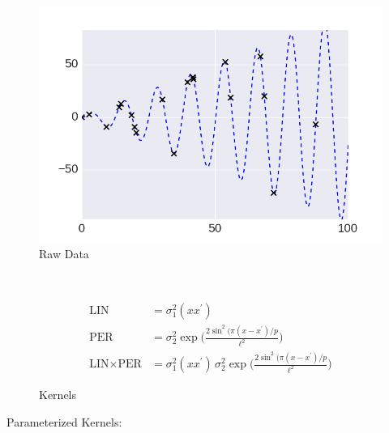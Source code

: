  \centering

     \begin{subfigure}[b]{0.45\textwidth}
        \includegraphics[width=\textwidth]{figs/composition/composition_demo_raw_data.png}
        \caption{Raw Data}
    \end{subfigure}
    ~ %
    \begin{subfigure}[b]{0.45\textwidth}
\small
     \begin{align*}
    \text{LIN} &=   \sigma_1^2(x x^\prime)\\
    \text{PER} &=  \sigma_2^2 \exp \bigg( \frac{2 \sin^2 ( \pi (x - x^\prime)/p}{\ell^2} \bigg)\\ 
    \text{LIN} \times \text{PER} &=  \sigma_1^2(x x^\prime)\, \sigma_2^2 \exp \bigg( \frac{2 \sin^2 ( \pi (x - x^\prime)/p}{\ell^2} \bigg) 
    \end{align*}\vspace{5mm} 
        \caption{Kernels}
    \end{subfigure}\vspace{4mm} 


Parameterized Kernels:\vspace{3mm} 

